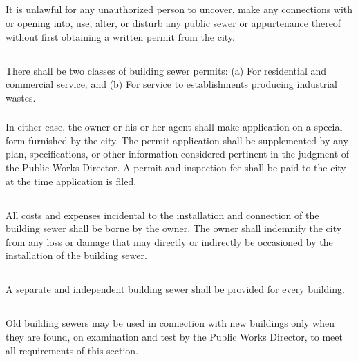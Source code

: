 \documentclass[code.tex]{subfiles}
\begin{document}
\subsection{}
It is unlawful for any unauthorized person to uncover, make any connections with or opening into, use, alter, or disturb any public sewer or appurtenance thereof without first obtaining a written permit from the city.
\subsection{}
\subsubsection{}
There shall be two classes of building sewer permits:
\newline\indent (a) For residential and commercial service; and
\newline\indent (b) For service to establishments producing industrial wastes.
\subsubsection{}
In either case, the owner or his or her agent shall make application on a special form furnished by the city.  The permit application shall be supplemented by any plan, specifications, or other information considered pertinent in the judgment of the Public Works Director.  A permit and inspection fee shall be paid to the city at the time application is filed.
\subsection{}
All costs and expenses incidental to the installation and connection of the building sewer shall be borne by the owner.  The owner shall indemnify the city from any loss or damage that may directly or indirectly be occasioned by the installation of the building sewer.
\subsection{}
A separate and independent building sewer shall be provided for every building.
\subsection{}
Old building sewers may be used in connection with new buildings only when they are found, on examination and test by the Public Works Director, to meet all requirements of this section.
\end{document}
